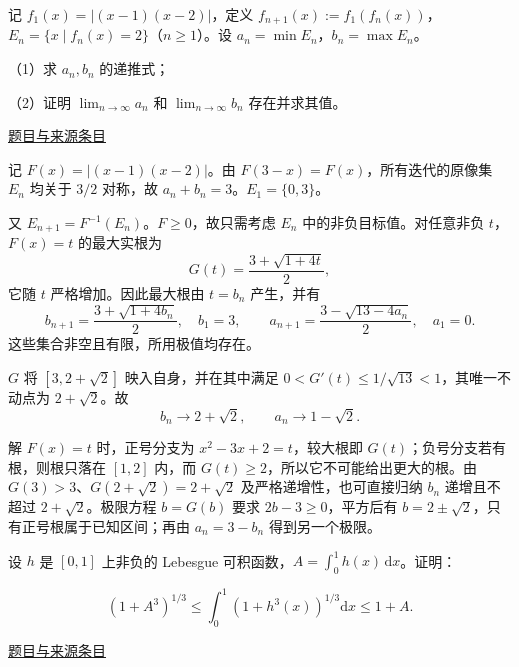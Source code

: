 \documentclass[UTF8,12pt,a4paper,fontset=fandol]{ctexart}
\begin{document}
\begin{example}\label{ex:fin17-low:7}\label{pr:fin17-low:7}

记 $f_1(x)=|(x-1)(x-2)|$，定义 $f_{n+1}(x):=f_1(f_n(x))$，$E_n=\{x\mid f_n(x)=2\}$（$n\ge1$）。设 $a_n=\min E_n$，$b_n=\max E_n$。

（1）求 $a_n,b_n$ 的递推式；

（2）证明 $\lim_{n\to\infty}a_n$ 和 $\lim_{n\to\infty}b_n$ 存在并求其值。

\par\href{https://github.com/lzxcr/cmc-mathematics/blob/64916fa1fdbc3e444a652eca204d5669058ee321/src/problems/finals/17/09.md}{题目与来源条目}

\end{example}

\begin{solve}\label{ans:fin17-low:7}

记 $F(x)=|(x-1)(x-2)|$。由 $F(3-x)=F(x)$，所有迭代的原像集 $E_n$ 均关于 $3/2$ 对称，故 $a_n+b_n=3$。$E_1=\{0,3\}$。

又 $E_{n+1}=F^{-1}(E_n)$。$F\ge0$，故只需考虑 $E_n$ 中的非负目标值。对任意非负 $t$，$F(x)=t$ 的最大实根为
\[
G(t)=\frac{3+\sqrt{1+4t}}2,
\]
它随 $t$ 严格增加。因此最大根由 $t=b_n$ 产生，并有
\[
\boxed{b_{n+1}=\frac{3+\sqrt{1+4b_n}}2,\quad b_1=3},
\qquad
\boxed{a_{n+1}=\frac{3-\sqrt{13-4a_n}}2,\quad a_1=0}.
\]
这些集合非空且有限，所用极值均存在。

$G$ 将 $[3,2+\sqrt2]$ 映入自身，并在其中满足 $0<G'(t)\le1/\sqrt{13}<1$，其唯一不动点为 $2+\sqrt2$。故
\[
\boxed{b_n\to2+\sqrt2,\qquad a_n\to1-\sqrt2}.
\]

解 $F(x)=t$ 时，正号分支为 $x^2-3x+2=t$，较大根即 $G(t)$；负号分支若有根，则根只落在 $[1,2]$ 内，而 $G(t)\ge2$，所以它不可能给出更大的根。由 $G(3)>3$、$G(2+\sqrt2)=2+\sqrt2$ 及严格递增性，也可直接归纳 $b_n$ 递增且不超过 $2+\sqrt2$。极限方程 $b=G(b)$ 要求 $2b-3\ge0$，平方后有 $b=2\pm\sqrt2$，只有正号根属于已知区间；再由 $a_n=3-b_n$ 得到另一个极限。

\end{solve}

\begin{example}\label{ex:fin17-high:8}\label{pr:fin17-high:8}

设 $h$ 是 $[0,1]$ 上非负的 Lebesgue 可积函数，$A=\int_0^1h(x)\,\mathrm{d}x$。证明：

\[
\left(1+A^3\right)^{1/3}\le\int_0^1\left(1+h^3(x)\right)^{1/3}\mathrm{d}x\le1+A .
\]

\par\href{https://github.com/lzxcr/cmc-mathematics/blob/64916fa1fdbc3e444a652eca204d5669058ee321/src/problems/finals/17/10.md}{题目与来源条目}

\end{example}
\end{document}
